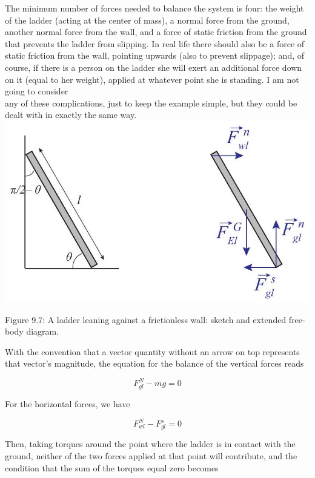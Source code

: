 \documentclass[10pt]{article}
\begin{document}
The minimum number of forces needed to balance the system is four: the weight of the ladder (acting at the center of mass), a normal force from the ground, another normal force from the wall, and a force of static friction from the ground that prevents the ladder from slipping. In real life there should also be a force of static friction from the wall, pointing upwards (also to prevent slippage); and, of course, if there is a person on the ladder she will exert an additional force down on it (equal to her weight), applied at whatever point she is standing. I am not going to consider\\
any of these complications, just to keep the example simple, but they could be dealt with in exactly the same way.\\
\includegraphics[max width=\textwidth, center]{2024_09_14_9969b06773f10b6936e8g-224}

Figure 9.7: A ladder leaning against a frictionless wall: sketch and extended free-body diagram.

With the convention that a vector quantity without an arrow on top represents that vector's magnitude, the equation for the balance of the vertical forces reads


\begin{equation*}
F_{g l}^{N}-m g=0 \tag{9.29}
\end{equation*}


For the horizontal forces, we have


\begin{equation*}
F_{w l}^{N}-F_{g l}^{s}=0 \tag{9.30}
\end{equation*}


Then, taking torques around the point where the ladder is in contact with the ground, neither of the two forces applied at that point will contribute, and the condition that the sum of the torques equal zero becomes
\end{document}
